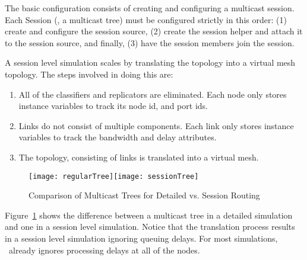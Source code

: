 The basic configuration consists of creating and configuring
a  multicast session.
Each Session (\ie, a multicast tree) must be configured strictly in
this order:
(1) create and configure the session source,
(2) create the session helper and attach it to the session source, and
finally, (3) have the session members join the session.
A session level simulation scales by translating the topology
into a virtual mesh topology.
The steps involved in doing this are:
\begin{enumerate}\itemsep0pt
\item All of the classifiers and replicators are eliminated.
  Each node only stores instance variables to track its node id, and port ids.
\item Links do not consist of multiple components.
  Each link only stores instance variables to track the bandwidth and delay attributes.
\item The topology, consisting of links is translated into a virtual mesh.
\end{enumerate}
\begin{figure}
  \centerline{\texttt{[image: regularTree]}\hfil\texttt{[image: sessionTree]}}
  \caption{Comparison of Multicast Trees for Detailed vs. Session Routing}
  \label{fig:conversions}
\end{figure}
Figure~\ref{fig:conversions} shows the difference between a
multicast tree in a detailed simulation and one in a session level simulation.
Notice that the translation process results in a session level simulation
ignoring queuing delays.
For most simulations, \ns\ already ignores processing delays at all of the nodes.

